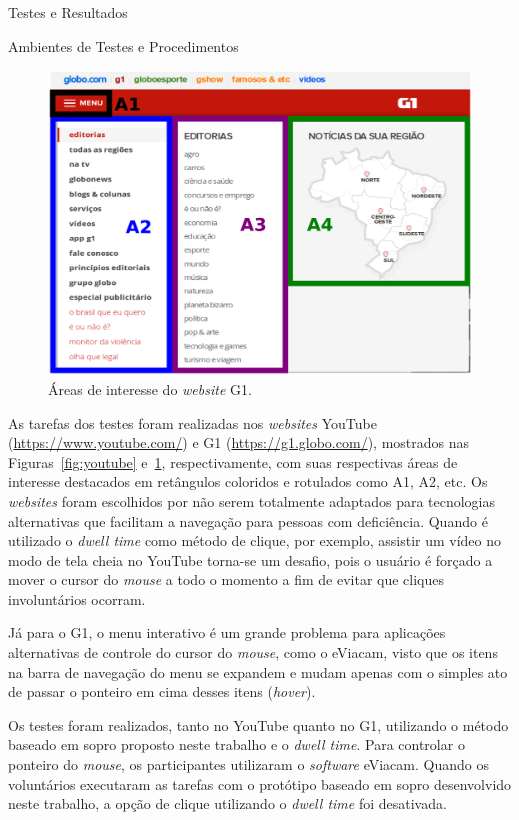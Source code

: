 \begin{chapter}{Testes e Resultados}
\begin{section}{Ambientes de Testes e Procedimentos}
\begin{figure}[!b]
	\centering
	\includegraphics[width=.8\linewidth]{fig/g1}
	\caption{Áreas de interesse do \textit{website} G1.}
	\label{fig:g1}
\end{figure}

As tarefas dos testes foram realizadas nos \textit{websites}
YouTube (\url{https://www.youtube.com/}) e
G1 (\url{https://g1.globo.com/}), mostrados nas
Figuras~\ref{fig:youtube} e~\ref{fig:g1}, respectivamente, com suas respectivas
áreas de interesse destacados em retângulos coloridos e rotulados como A1, A2,
etc. Os \textit{websites} foram escolhidos por não serem totalmente adaptados
para tecnologias alternativas que facilitam a navegação para pessoas com
deficiência. Quando é utilizado o \textit{dwell time} como método de clique, por
exemplo, assistir um vídeo no modo de tela cheia no YouTube torna-se um desafio,
pois o usuário é forçado a mover o cursor do \textit{mouse} a todo o momento
a fim de evitar que cliques involuntários ocorram. 

Já para o G1, o menu
interativo é um grande problema para aplicações alternativas de controle
do cursor do \textit{mouse}, como o eViacam, visto que os itens na barra de
navegação do menu se expandem e mudam apenas com o simples ato de passar o
ponteiro em cima desses itens (\textit{hover}).

Os testes foram realizados, tanto no YouTube quanto no G1, utilizando o método
baseado em sopro proposto neste trabalho e o \textit{dwell time}. Para controlar
o ponteiro do \textit{mouse}, os participantes utilizaram o \textit{software}
eViacam. Quando os voluntários executaram as tarefas com o protótipo baseado em
sopro desenvolvido neste trabalho, a opção de clique utilizando o 
\textit{dwell time} foi desativada. 


\end{section}
\end{chapter}
